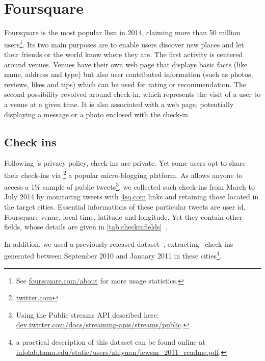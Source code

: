 \section{Foursquare}
\label{sec:foursquare}

Foursquare is the most popular \gls{lbsn} in 2014, claiming more than 50
million users\footnote{See \href{https://foursquare.com/about/}%
{\url{foursquare.com/about}} for more usage statistics.}. Its two main purposes
are to enable users discover new places and let their friends or the world know
where they are. The first activity is centered around venues. Venues have their
own web page that displays basic facts (like name, address and type) but also
user contributed information (such as photos, reviews, likes and tips) which
can be used for rating or recommendation. The second possibility revolved
around check-in, which represents the visit of a user to a venue at a given
time. It is also associated with a web page, potentially displaying a message
or a photo enclosed with the check-in.

\subsection{Check ins}

Following \fs's privacy policy, check-ins are private.  Yet some users opt to
share their check-ins via \tw\footnote{\href{https://twitter.com/}%
{\url{twitter.com}}} a popular micro-blogging platform. 
As \tw{} allows anyone to access a 1\% sample of public tweets\footnote{Using
the Public streams API described here:
\href{https://dev.twitter.com/docs/streaming-apis/streams/public}%
{\url{dev.twitter.com/docs/streaming-apis/streams/public}}.},
we collected such check-ins
from March to July 2014 by monitoring tweets with
\url{4sq.com} links and retaining those located in the target cities.
Essential informations of these  particular tweets are user id, Foursquare venue,
local time, latitude and longitude. Yet they contain other fields, whose
details are given in \autoref{tab:checkinfields}~\pageref{tab:checkinfields}.

In addition, we used a previously released dataset~\autocite{dataset11},
extracting  \fs\ check-ins generated between September 2010
and January 2011 in these cities\footnote{a practical description of this
	dataset can be found online at
	\href{http://infolab.tamu.edu/static/users/zhiyuan/icwsm\_2011\_readme.pdf}%
{\url{infolab.tamu.edu/static/users/zhiyuan/icwsm_2011_readme.pdf}}.}.


